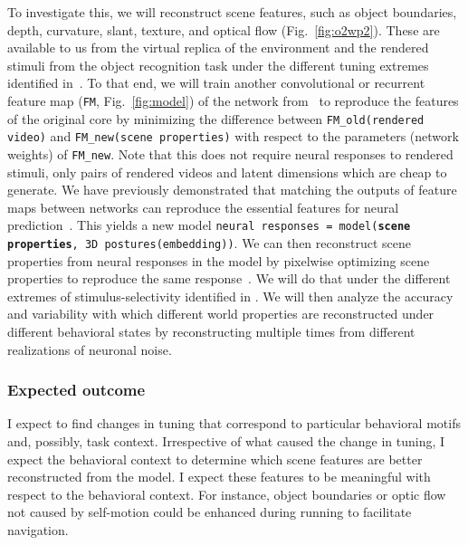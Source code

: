 \documentclass[B2,COG]{ercgrant}
\begin{document}
To investigate this, we will reconstruct scene features, such as object boundaries, depth, curvature, slant, texture, and optical flow (Fig.~\ref{fig:o2wp2}). These are available to us from the virtual replica of the environment and the rendered stimuli from the object recognition task under the different tuning extremes identified in~.
To that end, we will train another convolutional or recurrent feature map (\texttt{FM}, Fig.~\ref{fig:model}) of the network from~ to reproduce the features of the original core by minimizing the difference between 
    \texttt{FM\_old(rendered video)} and \texttt{FM\_new(scene properties)}
with respect to the parameters (network weights) of \texttt{FM\_new}. 
Note that this does not require neural responses to rendered stimuli, only pairs of rendered videos and latent dimensions which are cheap to generate. 
We have previously demonstrated that matching the outputs of  feature maps between networks can reproduce the essential features for neural prediction~\parencite{Safarani2021-yy}.
This yields a new model \texttt{neural responses = model(\textbf{scene properties}, 3D postures(embedding))}.
We can then reconstruct scene properties from neural responses in the model by pixelwise optimizing scene properties to reproduce the same response~\parencite{Cobos2022-rr}.
We will do that under the different extremes of stimulus-selectivity identified in .
We will then analyze the accuracy and variability with which different world properties are reconstructed under different behavioral states by reconstructing multiple times from different realizations of neuronal noise.

\subsubsection{Expected outcome} 
I expect to find changes in tuning that correspond to particular behavioral motifs and, possibly, task context.
Irrespective of what caused the change in tuning, I expect the behavioral context to determine which scene features are better reconstructed from the model.
I expect these features to be meaningful with respect to the behavioral context. 
For instance, object boundaries or optic flow not caused by self-motion could be enhanced during running to facilitate navigation. 
\end{document}
